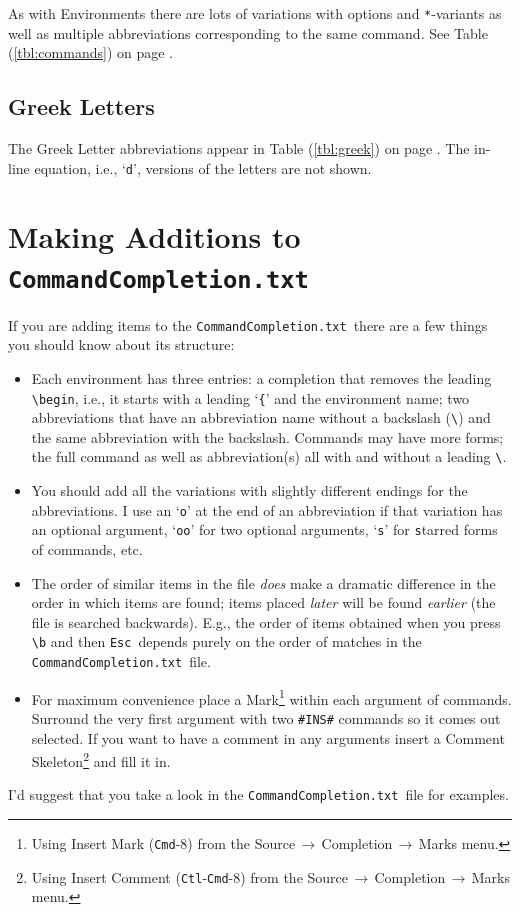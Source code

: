 \documentclass[11pt]{article}
\newcommand{\ctlkey}{\texttt{Ctl}}
\newcommand{\cmdkey}{\texttt{Cmd}}
\newcommand{\esckey}{\texttt{Esc}}
\newcommand{\mnu}[1]{\textsf{#1}}
\newcommand{\To}{\,\(\to\)\,}
\newcommand{\CCT}{\texttt{CommandCompletion.txt}}
\begin{document}
As with Environments there are lots of variations with options and \texttt{*}-variants as well as multiple abbreviations corresponding to the same command. See Table (\ref{tbl:commands}) on page \pageref{tbl:commands}.

\subsection*{Greek Letters}

The Greek Letter abbreviations appear in Table (\ref{tbl:greek}) on page \pageref{tbl:greek}. The in-line equation, i.e., `\texttt{d}', versions of the letters are not shown.

\section*{Making Additions to \CCT}

If you are adding items to the \CCT\ there are a few things you should know about its structure:
\begin{itemize}
\item
Each environment has three entries: a completion that removes the leading \verb|\begin|, i.e., it starts with a leading `\texttt{\{}' and the environment name; two abbreviations that have an abbreviation name without a backslash (\verb|\|) and the same abbreviation with the backslash. Commands may have more forms; the full command as well as abbreviation(s) all with and without a leading \verb|\|.
\item
You should add all the variations with slightly different endings for the abbreviations. I use an `\texttt{o}' at the end of an abbreviation if that variation has an optional argument, `\texttt{oo}' for two optional arguments, `\texttt{s}' for \texttt{s}tarred forms of commands, etc.
\item
The order of similar items in the file \emph{does} make a dramatic difference in the order in which items are found; items placed \emph{later} will be found \emph{earlier} (the file is searched backwards). E.g., the order of items obtained when you press \verb|\b| and then \esckey\ depends purely on the order of matches in the \CCT\ file.
\item
For maximum convenience place a Mark\footnote{Using \mnu{Insert Mark} (\cmdkey-8) from the \mnu{Source}\To\mnu{Completion}\To\mnu{Marks} menu.} within each argument of commands. Surround the very first argument with two \verb|#INS#| commands so it comes out selected. If you want to have a comment in any arguments insert a Comment Skeleton\footnote{Using \mnu{Insert Comment} (\ctlkey-\cmdkey-8) from the \mnu{Source}\To\mnu{Completion}\To\mnu{Marks} menu.} and fill it in.
\end{itemize}
I'd suggest that you take a look in the \CCT\ file for examples.
\end{document}
